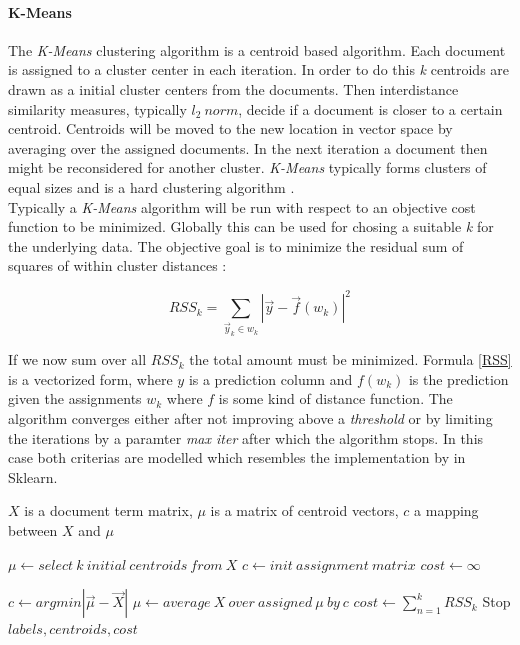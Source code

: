    \paragraph{K-Means}
    The \emph{K-Means} clustering algorithm is a centroid based algorithm. Each document is assigned to a cluster center in each iteration. In order to do this \emph{k} centroids are drawn as a initial cluster centers from the documents. Then interdistance similarity measures, typically $l_2\:norm$, decide if a document is closer to a certain centroid. Centroids will be moved to the new location in vector space by averaging over the assigned documents. In the next iteration a document then might be reconsidered for another cluster. \emph{K-Means} typically forms clusters of equal sizes and is a hard clustering algorithm \cite{IRBookStanford2008}.\\
    Typically a \emph{K-Means} algorithm will be run with respect to an objective cost function to be minimized. Globally this can be used for chosing a suitable \emph{k} for the underlying data. The objective goal is to minimize the residual sum of squares of within cluster distances \cite{IRBookStanford2008}:

      \begin{equation}
        RSS_k = \sum_{\vec{y}_k \in \textit{w}_k}|\vec{y} - \vec{f}(\textit{w}_k)|^{2}
        \label{RSS}
      \end{equation}

    If we now sum over all $RSS_k$ the total amount must be minimized. Formula \ref{RSS} is a vectorized form, where $y$ is a prediction column and $f(w_k)$ is the prediction given the assignments $w_k$ where $f$ is some kind of distance function. The algorithm converges either after not improving above a \emph{threshold} or by limiting the iterations by a paramter \emph{max iter} after which the algorithm stops. In this case both criterias are modelled which resembles the implementation by \cite{ScikitLearn} in Sklearn.

    \begin{algorithm}[H]
    \begin{algorithmic}[1]
      \caption{$X$ is a document term matrix, $\mu$ is a matrix of centroid vectors, $c$ a mapping between $X$ and $\mu$}\label{kmeans}
        \State $\mu \gets select\:k\:initial\:centroids\:from\:X$
        \State $c \gets init\:assignment\:matrix {}$
        \State $cost \gets \infty$

          \State $c \gets argmin|\vec{\mu} - \vec{X}|$ 
          \State $\mu \gets average\:X\:over\:assigned\:\mu\:by\:c$
          \State $cost \gets \sum_{n = 1}^{k}RSS_k$
            \State Stop
          \EndIf
        \EndFor
        \State \Return $labels, centroids, cost$
      \EndFunction
    \end{algorithmic}
    \end{algorithm}

